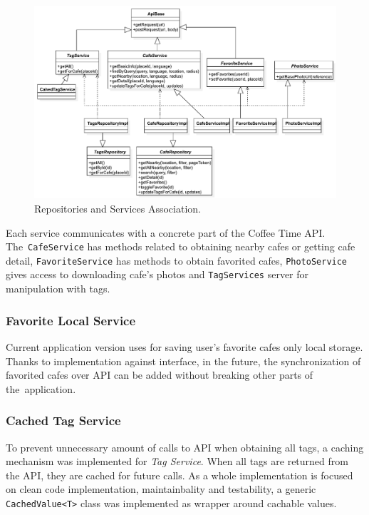 \begin{figure}[ht]
    \centering
    \includegraphics[width=\textwidth]{img/implementation/repo-services.pdf}
    \caption{Repositories and Services Association.}
    \label{fig:ct-repo-services}
\end{figure}

Each service communicates with a concrete part of the Coffee Time API. The~\verb|CafeService| has methods related to obtaining nearby cafes or getting cafe detail, \verb|FavoriteService| has methods to obtain favorited cafes, \verb|PhotoService| gives access to downloading cafe's photos and \verb|TagServices| server for manipulation with tags. 

\subsubsection{Favorite Local Service}
Current application version uses for saving user's favorite cafes only local storage. Thanks to implementation against interface, in the future, the synchronization of favorited cafes over API can be added without breaking other parts of the~application. 

\subsubsection{Cached Tag Service}
To prevent unnecessary amount of calls to API when obtaining all tags, a caching mechanism was implemented for \textit{Tag Service}. When all tags are returned from the API, they are cached for future calls. As a whole implementation is focused on clean code implementation, maintainbality and testability, a generic \verb|CachedValue<T>| class was implemented as wrapper around cachable values. 

